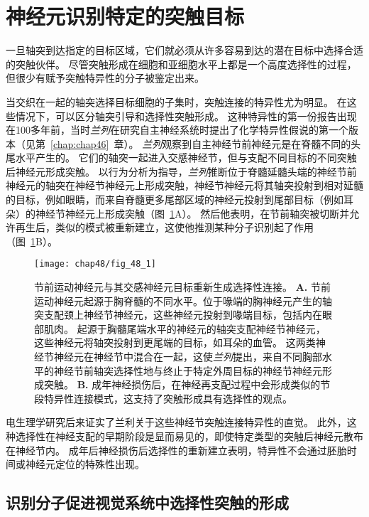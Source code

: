 \section{神经元识别特定的突触目标}

一旦轴突到达指定的目标区域，它们就必须从许多容易到达的潜在目标中选择合适的突触伙伴。
尽管突触形成在细胞和亚细胞水平上都是一个高度选择性的过程，但很少有赋予突触特异性的分子被鉴定出来。


当交织在一起的轴突选择目标细胞的子集时，突触连接的特异性尤为明显。
在这些情况下，可以区分轴突引导和选择性突触形成。
这种特异性的第一份报告出现在100多年前，当时\textit{兰列}在研究自主神经系统时提出了化学特异性假说的第一个版本（见第~\ref{chap:chap46}~章）。
\textit{兰列}观察到自主神经节前神经元是在脊髓不同的头尾水平产生的。
它们的轴突一起进入交感神经节，但与支配不同目标的不同突触后神经元形成突触。
以行为分析为指导，\textit{兰列}推断位于脊髓延髓头端的神经节前神经元的轴突在神经节神经元上形成突触，神经节神经元将其轴突投射到相对延髓的目标，例如眼睛，而来自脊髓更多尾部区域的神经元投射到尾部目标（例如耳朵）的神经节神经元上形成突触（图~\ref{fig:48_1}A）。
然后他表明，在节前轴突被切断并允许再生后，类似的模式被重新建立，这使他推测某种分子识别起了作用（图~\ref{fig:48_1}B）。


\begin{figure}[htbp]
	\centering
	\texttt{[image: chap48/fig\_48\_1]}
	\caption{节前运动神经元与其交感神经元目标重新生成选择性连接。
		\textbf{A.} 节前运动神经元起源于胸脊髓的不同水平。位于喙端的胸神经元产生的轴突支配颈上神经节神经元，这些神经元投射到喙端目标，包括内在眼部肌肉。
		起源于胸髓尾端水平的神经元的轴突支配神经节神经元，这些神经元将轴突投射到更尾端的目标，如耳朵的血管。
		这两类神经节神经元在神经节中混合在一起，这使\textit{兰列}提出，来自不同胸部水平的神经节前轴突选择性地与终止于特定外周目标的神经节神经元形成突触。
		\textbf{B.} 成年神经损伤后，在神经再支配过程中会形成类似的节段特异性连接模式，这支持了突触形成具有选择性的观点\cite{njaa1977specific}。}
	\label{fig:48_1}
\end{figure}


电生理学研究后来证实了兰利关于这些神经节突触连接特异性的直觉。
此外，这种选择性在神经支配的早期阶段是显而易见的，即使特定类型的突触后神经元散布在神经节内。
成年后神经损伤后选择性的重新建立表明，特异性不会通过胚胎时间或神经元定位的特殊性出现。



\subsection{识别分子促进视觉系统中选择性突触的形成}

